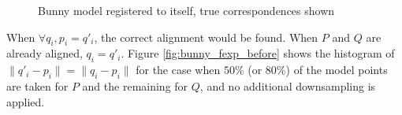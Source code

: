 \begin{figure}[p]
\centering
{
	\setlength{\fboxsep}{0pt}%
	\setlength{\fboxrule}{0.5pt}%
}
\caption{Bunny model registered to itself, true correspondences shown}
\label{fig:bunny_first_tcor}
\end{figure}

When $\forall q_i, p_i = q'_i$, the correct alignment would be found. When $P$ and $Q$ are already aligned, $q_i = q'_i$. Figure \ref{fig:bunny_fexp_before} shows the histogram of $\|q'_i - p_i\| = \|q_i - p_i\|$ for the case when $50\%$ (or $80\%$) of the model points are taken for $P$ and the remaining for $Q$, and no additional downsampling is applied.

